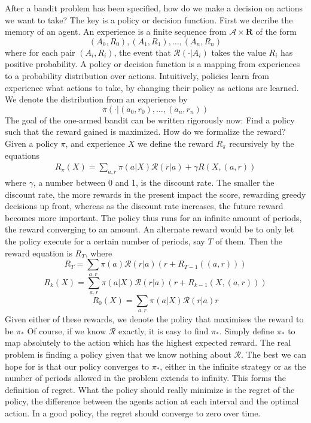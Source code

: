 \documentclass{report}
\begin{document}
After a bandit problem has been specified, how do we make a decision on actions we want to take? The key is a policy or decision function. First we decribe the memory of an agent. An experience is a finite sequence from $\mathcal{A} \times \mathbf{R}$ of the form
%
\[ (A_0, R_0), (A_1, R_1), \dots, (A_n, R_n) \]
%
\noindent where for each pair $(A_i, R_i)$, the event that $\mathcal{R}(\cdotp|A_i)$ takes the value $R_i$ has positive probability. A policy or decision function is a mapping from experiences to a probability distribution over actions. Intuitively, policies learn from experience what actions to take, by changing their policy as actions are learned. We denote the distribution from an experience by
%
\[ \pi(\cdotp|(a_0,r_0),\dots,(a_n,r_n)) \]
%
The goal of the one-armed bandit can be written rigorously now: Find a policy such that the reward gained is maximized. How do we formalize the reward? Given a policy $\pi$, and experience $X$ we define the reward $R_\pi$ recursively by the equations
%
\begin{align*}
R_\pi(X) = \sum_{a,r} \pi(a|X)\mathcal{R}(r|a) + \gamma R(X,(a,r))
\end{align*}
%
where $\gamma$, a number between 0 and 1, is the discount rate. The smaller the discount rate, the more rewards in the present impact the score, rewarding greedy decisions up front, whereas as the discount rate increases, the future reward becomes more important. The policy thus runs for an infinite amount of periods, the reward converging to an amount. An alternate reward would be to only let the policy execute for a certain number of periods, say $T$ of them. Then the reward equation is $R_T$, where
%
\[ R_T = \sum_{a,r} \pi(a)\mathcal{R}(r|a)(r + R_{T-1}((a,r))) \]
%
\[ R_k(X) = \sum_{a,r} \pi(a|X)\mathcal{R}(r|a)(r + R_{k-1}(X,(a,r))) \]
%
\[ R_0(X) = \sum_{a,r} \pi(a|X)\mathcal{R}(r|a)r \]
%
Given either of these rewards, we denote the policy that maximises the reward to be $\pi_*$
Of course, if we know $\mathcal{R}$ exactly, it is easy to find $\pi_*$. Simply define $\pi_*$ to map absolutely to the action which has the highest expected reward. The real problem is finding a policy given that we know nothing about $\mathcal{R}$. The best we can hope for is that our policy converges to $\pi_*$, either in the infinite strategy or as the number of periods allowed in the problem extends to infinity. This forms the definition of regret. What the policy should really minimize is the regret of the policy, the difference between the agents action at each interval and the optimal action. In a good policy, the regret should converge to zero over time.
\end{document}
